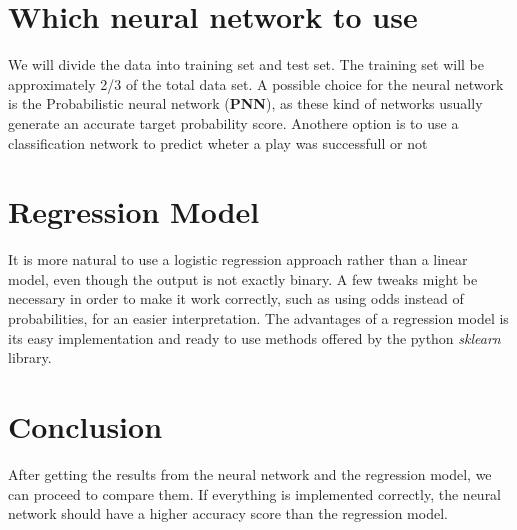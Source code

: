 \documentclass{article}
\begin{document}
\section{Which neural network to use}
We will divide the data into training set and test set. The training set will be approximately 2/3 of the total data set.  
A possible choice for the neural network is the Probabilistic neural network (\textbf{PNN}), as these kind of networks usually generate an accurate target probability score.
Anothere option is to use a classification network to predict wheter a play was successfull or not
\section{Regression Model}
It is more natural to use a logistic regression approach rather than a linear model, even though the output is not exactly binary. A few tweaks might be necessary in order to make it work correctly, such as using odds instead of probabilities, for an easier interpretation.
The advantages of a regression model is its easy implementation and ready to use methods offered by the python \textit{sklearn} library.
\section{Conclusion}
After getting the results from the neural network and the regression model, we can proceed to compare them. If everything is implemented correctly, the neural network should have a higher accuracy score than the regression model.
\end{document}
